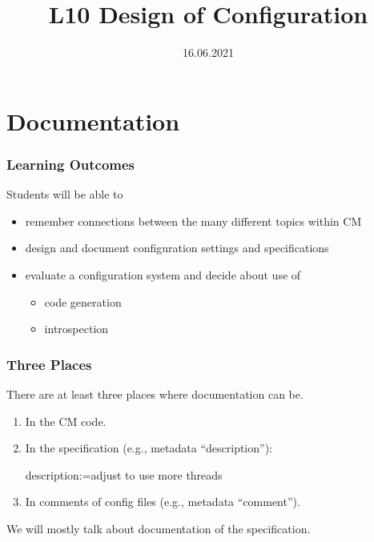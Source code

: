 

\title{L10 Design of Configuration}
\date{16.06.2021}






\section{Documentation}

\begin{frame}
	\frametitle{Learning Outcomes}
	Students will be able to

	\begin{itemize}
	\item remember connections between the many different topics within CM
	\item design and document configuration settings and specifications
	\item evaluate a configuration system and decide about use of
	\begin{itemize}
	\item code generation
	\item introspection
	\end{itemize}
	\end{itemize}
\end{frame}

\begin{frame}[fragile]
	\frametitle{Three Places}

	There are at least three places where documentation can be.

	\begin{enumerate}
	\item In the CM code.
	\item In the specification (e.g., metadata ``description''):
	\begin{code}
	  description:=adjust to use more threads
	\end{code}
	\item In comments of config files (e.g., metadata ``comment'').
	\end{enumerate}

	We will mostly talk about documentation of the specification.
\end{frame}


\begin{frame}
\end{frame}

